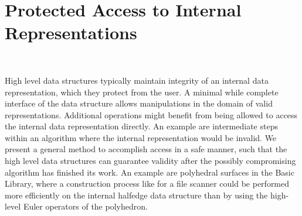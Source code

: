 
\beforecprogskip\medskipamount
\aftercprogskip\medskipamount
\ccParDims

\section{Protected Access to Internal Representations}
\\


High level data structures typically maintain integrity of an internal
data representation, which they protect from the user. A minimal while
complete interface of the data structure allows manipulations in the
domain of valid representations. Additional operations might benefit
from being allowed to access the internal data representation
directly. An example are intermediate steps within an algorithm where
the internal representation would be invalid. We present a general
method to accomplish access in a safe manner, such that the high level
data structures can guarantee validity after the possibly compromising
algorithm has finished its work. An example are polyhedral surfaces in
the Basic Library, where a construction process like for
a file scanner could be performed more efficiently on the internal
halfedge data structure than by using the high-level Euler operators
of the polyhedron.

